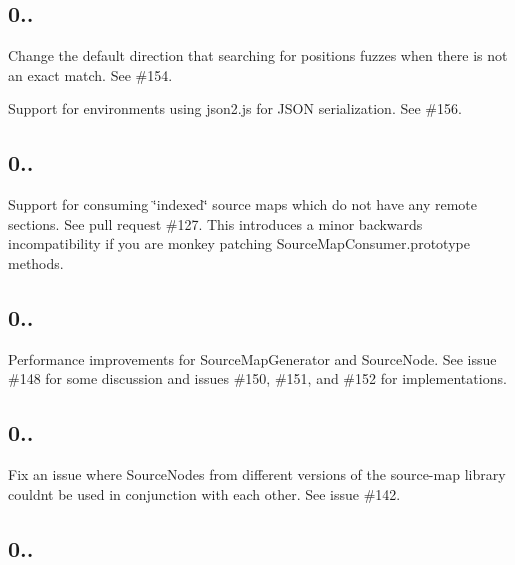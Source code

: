\subsection*{0..}


\begin{DoxyItemize}
\item Change the default direction that searching for positions fuzzes when there is not an exact match. See \#154.
\item Support for environments using json2.\+js for J\+S\+ON serialization. See \#156.
\end{DoxyItemize}

\subsection*{0..}


\begin{DoxyItemize}
\item Support for consuming \char`\"{}indexed\char`\"{} source maps which do not have any remote sections. See pull request \#127. This introduces a minor backwards incompatibility if you are monkey patching {\ttfamily Source\+Map\+Consumer.\+prototype} methods.
\end{DoxyItemize}

\subsection*{0..}


\begin{DoxyItemize}
\item Performance improvements for {\ttfamily Source\+Map\+Generator} and {\ttfamily Source\+Node}. See issue \#148 for some discussion and issues \#150, \#151, and \#152 for implementations.
\end{DoxyItemize}

\subsection*{0..}


\begin{DoxyItemize}
\item Fix an issue where {\ttfamily Source\+Node}s from different versions of the source-\/map library couldn\textquotesingle{}t be used in conjunction with each other. See issue \#142.
\end{DoxyItemize}

\subsection*{0..}


